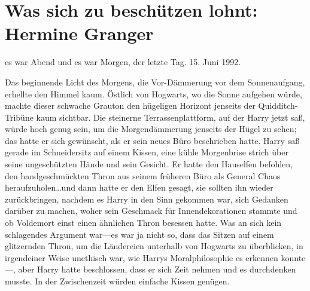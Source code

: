 \chapter{Was sich zu beschützen lohnt: Hermine Granger}

 es war Abend und es war Morgen, der letzte Tag. 15. Juni 1992.

\hplettrineextrapara
Das beginnende Licht des Morgens, die Vor-Dämmerung vor dem Sonnenaufgang, erhellte den Himmel kaum. Östlich von Hogwarts, wo die Sonne aufgehen würde, machte dieser schwache Grauton den hügeligen Horizont jenseits der Quidditch-Tribüne kaum sichtbar.
Die steinerne Terrassenplattform, auf der Harry jetzt saß, würde hoch genug sein, um die Morgendämmerung jenseits der Hügel zu sehen; das hatte er sich gewünscht, als er sein neues Büro beschrieben hatte.
Harry saß gerade im Schneidersitz auf einem Kissen, eine kühle Morgenbrise strich über seine ungeschützten Hände und sein Gesicht. Er hatte den Hauselfen befohlen, den handgeschmückten Thron aus seinem früheren Büro als General Chaos heraufzuholen…und dann hatte er den Elfen gesagt, sie sollten ihn wieder zurückbringen, nachdem es Harry in den Sinn gekommen war, sich Gedanken darüber zu machen, woher sein Geschmack für Innendekorationen stammte und ob Voldemort einst einen ähnlichen Thron besessen hatte. Was an sich kein schlagendes Argument war—es war ja nicht so, dass das Sitzen auf einem glitzernden Thron, um die Ländereien unterhalb von Hogwarts zu überblicken, in irgendeiner Weise unethisch war, wie Harrys Moralphilosophie es erkennen konnte—, aber Harry hatte beschlossen, dass er sich Zeit nehmen und es durchdenken musste. In der Zwischenzeit würden einfache Kissen genügen.

